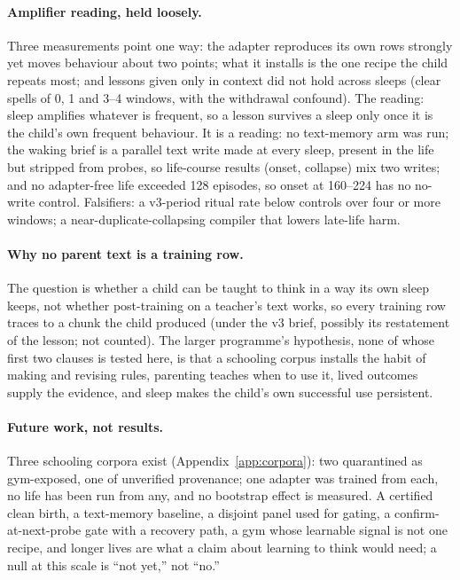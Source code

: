 \documentclass{article}
\begin{document}
\paragraph{Amplifier reading, held loosely.} Three measurements point one way: the adapter reproduces its own rows strongly yet moves behaviour about two points; what it installs is the one recipe the child repeats most; and lessons given only in context did not hold across sleeps (clear spells of 0, 1 and 3--4 windows, with the withdrawal confound). The reading: sleep amplifies whatever is frequent, so a lesson survives a sleep only once it is the child's own frequent behaviour. It is a reading: no text-memory arm was run; the waking brief is a parallel text write made at every sleep, present in the life but stripped from probes, so life-course results (onset, collapse) mix two writes; and no adapter-free life exceeded 128 episodes, so onset at 160--224 has no no-write control. Falsifiers: a v3-period ritual rate below controls over four or more windows; a near-duplicate-collapsing compiler that lowers late-life harm.

\paragraph{Why no parent text is a training row.} The question is whether a child can be taught to think in a way its own sleep keeps, not whether post-training on a teacher's text works, so every training row traces to a chunk the child produced (under the v3 brief, possibly its restatement of the lesson; not counted). The larger programme's hypothesis, none of whose first two clauses is tested here, is that a schooling corpus installs the habit of making and revising rules, parenting teaches when to use it, lived outcomes supply the evidence, and sleep makes the child's own successful use persistent.

\paragraph{Future work, not results.} Three schooling corpora exist (Appendix~\ref{app:corpora}): two quarantined as gym-exposed, one of unverified provenance; one adapter was trained from each, no life has been run from any, and no bootstrap effect is measured. A certified clean birth, a text-memory baseline, a disjoint panel used for gating, a confirm-at-next-probe gate with a recovery path, a gym whose learnable signal is not one recipe, and longer lives are what a claim about learning to think would need; a null at this scale is ``not yet,'' not ``no.''
\end{document}
